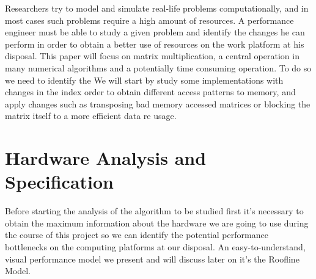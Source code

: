 \documentclass[conference]{IEEEtran}
\begin{document}
Researchers try to model and simulate real-life problems computationally, and in most cases such problems require a high amount of resources. A performance engineer must be able to study a given problem and identify the changes he can perform in order to obtain a better use of resources on the work platform at his disposal. 
This paper will focus on matrix multiplication, a central operation in many numerical algorithms and a potentially time consuming operation. To do so we need to identify the 
We will start by study some implementations with changes in the index order to obtain different access patterns to memory, and apply changes such as transposing bad memory accessed matrices or blocking the matrix itself to a more efficient data re usage. 


\section{Hardware Analysis and Specification}

Before starting the analysis of the algorithm to be studied first it's necessary to obtain the maximum information about the hardware we are going to use during the course of this project so we can identify the potential performance bottlenecks on the computing platforms at our disposal. An easy-to-understand, visual performance model we present and will discuss later on it's the Roofline Model. 
\end{document}
